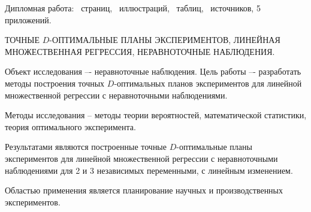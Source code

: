 Дипломная работа: \ страниц, \totalfigures{}~иллюстраций, \totaltables{}\ таблиц,
\ источников, 5 приложений.

\vspace{\baselineskip}

ТОЧНЫЕ $D$-ОПТИМАЛЬНЫЕ ПЛАНЫ ЭКСПЕРИМЕНТОВ, ЛИНЕЙНАЯ МНОЖЕСТВЕННАЯ РЕГРЕССИЯ, НЕРАВНОТОЧНЫЕ НАБЛЮДЕНИЯ.

\vspace{\baselineskip}

Объект исследования –- неравноточные наблюдения. Цель работы –- разработать методы построения точных $D$-оптимальных планов экспериментов для линейной множественной регрессии с неравноточными наблюдениями.

Методы исследования – методы теории вероятностей, математической
статистики, теория оптимального эксперимента.

Результатами являются построенные точные $D$-оптимальные планы экспериментов для линейной множественной регрессии с неравноточными наблюдениями для 2 и 3 независимых переменными, с линейным изменением.

Областью применения является планирование научных и производственных экспериментов.
